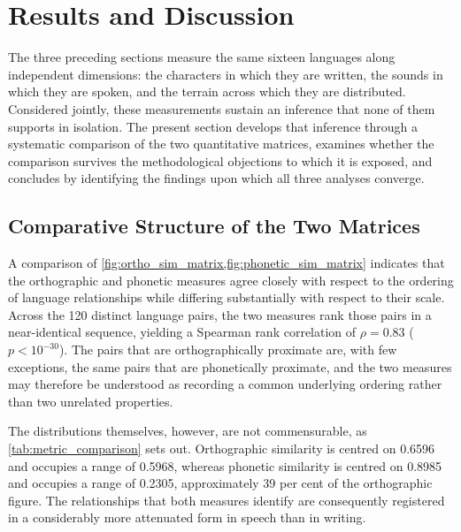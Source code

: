 \section{Results and Discussion}\label{sec:synthesis}

The three preceding sections measure the same sixteen languages along
independent dimensions: the characters in which they are written, the sounds in
which they are spoken, and the terrain across which they are distributed.
Considered jointly, these measurements sustain an inference that none of them
supports in isolation. The present section develops that inference through a
systematic comparison of the two quantitative matrices, examines whether the
comparison survives the methodological objections to which it is exposed, and
concludes by identifying the findings upon which all three analyses converge.

\subsection{Comparative Structure of the Two Matrices}

A comparison of \cref{fig:ortho_sim_matrix,fig:phonetic_sim_matrix} indicates
that the orthographic and phonetic measures agree closely with respect to the
ordering of language relationships while differing substantially with respect to
their scale. Across the 120 distinct language pairs, the two measures rank those
pairs in a near-identical sequence, yielding a Spearman rank correlation of
\( \rho = 0.83 \) (\( p < 10^{-30} \)). The pairs that are orthographically
proximate are, with few exceptions, the same pairs that are phonetically
proximate, and the two measures may therefore be understood as recording a
common underlying ordering rather than two unrelated properties.

The distributions themselves, however, are not commensurable, as
\cref{tab:metric_comparison} sets out. Orthographic similarity is centred on
0.6596 and occupies a range of 0.5968, whereas phonetic similarity is centred on
0.8985 and occupies a range of 0.2305, approximately 39 per cent of the
orthographic figure. The relationships that both measures identify are
consequently registered in a considerably more attenuated form in speech than in
writing.

